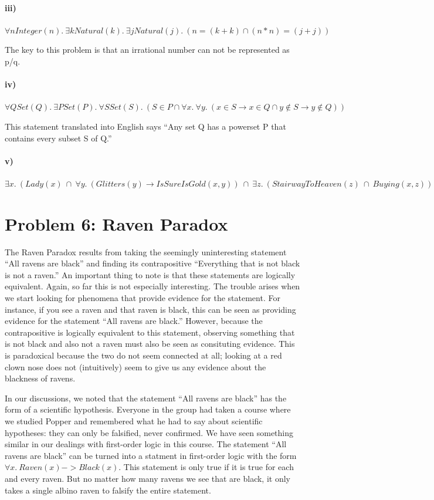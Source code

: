 \documentclass[10pt,letter]{article}
\begin{document}
\paragraph{iii)} $\forall n Integer(n) .\ \exists k Natural(k) .\ \exists j Natural(j) .\ (n = (k + k) \cap (n * n) = (j + j))$

The key to this problem is that an irrational number can not be represented as p/q.

\paragraph{iv)}
$\forall Q Set(Q) .\ \exists P Set(P) .\ \forall S Set(S) .\ (S \in P \cap \forall x .\ \forall y .\ (x \in S \rightarrow x \in Q \cap y \not \in S \rightarrow y \not \in Q))$

This statement translated into English says ``Any set Q has a powerset P that contains every subset S of Q.''
\paragraph{v)}
$\exists x .\ (Lady(x)\ \cap\ \forall y .\ (Glitters(y) \rightarrow IsSureIsGold(x, y))\ \cap\ \exists z .\ (StairwayToHeaven(z)\ \cap\ Buying(x, z)))$

\section*{Problem 6: Raven Paradox}
The Raven Paradox results from taking the seemingly uninteresting statement ``All ravens are black'' and finding its contrapositive ``Everything that is not black is not a raven.'' An important thing to note is that these statements are logically equivalent. Again, so far this is not especially interesting. The trouble arises when we start looking for phenomena that provide evidence for the statement. For instance, if you see a raven and that raven is black, this can be seen as providing evidence for the statement ``All ravens are black.'' However, because the contrapositive is logically equivalent to this statement, observing something that is not black and also not a raven must also be seen as consituting evidence. This is paradoxical because the two do not seem connected at all; looking at a red clown nose does not (intuitively) seem to give us any evidence about the blackness of ravens. 

In our discussions, we noted that the statement ``All ravens are black'' has the form of a scientific hypothesis. Everyone in the group had taken a course where we studied Popper and remembered what he had to say about scientific hypotheses: they can only be falsified, never confirmed. We have seen something similar in our dealings with first-order logic in this course. The statement ``All ravens are black'' can be turned into a statment in first-order logic with the form $\forall x .\ Raven(x) -> Black(x)$. This statement is only true if it is true for each and every raven. But no matter how many ravens we see that are black, it only takes a single albino raven to falsify the entire statement. 
\end{document}
